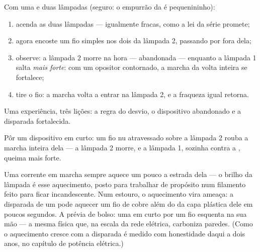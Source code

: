 \begin{method}\label{met:g7:short-circuits-safety:demo}
Com uma  e duas lâmpadas  (seguro: o empurrão da  é
pequenininho):
\begin{enumerate}
  \item acenda as duas lâmpadas --- igualmente fracas, como a lei da
        série promete;
  \item agora encoste um fio simples nos dois  da lâmpada 2,
        passando por fora dela;
  \item observe: a lâmpada 2 morre na hora --- abandonada ---
        enquanto a lâmpada 1 salta \emph{mais forte}: com um opositor
        contornado, a marcha da volta inteira se fortalece;
  \item tire o fio: a marcha volta a entrar na lâmpada 2, e a fraqueza
        igual retorna.
\end{enumerate}
Uma experiência, três lições: a regra do desvio, o dispositivo
abandonado e a disparada fortalecida.
\end{method}

\begin{omfigure}

{\small Pôr um dispositivo em curto: um fio nu atravessado sobre a
lâmpada 2 rouba a marcha inteira dela --- a lâmpada 2 morre, e a
lâmpada 1, sozinha contra a , queima mais forte.}
\end{omfigure}

\begin{example}\label{ex:g7:short-circuits-safety:heating}
Uma corrente em marcha sempre aquece um pouco a estrada dela --- o
brilho da lâmpada é esse aquecimento, posto para trabalhar de
propósito num filamento feito para ficar incandescente. Num estouro,
o aquecimento vira ameaça: a disparada de um  pode
aquecer um fio de cobre além do  da capa plástica dele
em poucos segundos. A prévia de bolso: uma  em curto por um fio
esquenta na sua mão --- a mesma física que, na escala da rede
elétrica, carboniza paredes. (Como o aquecimento cresce com a
disparada é medido com honestidade daqui a dois anos, no capítulo de
potência elétrica.)
\end{example}

